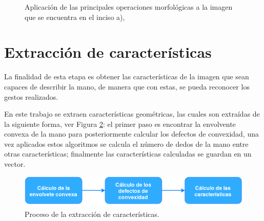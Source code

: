 \begin{figure}[h!]
\caption{Aplicación de las principales operaciones morfológicas a la imagen que se encuentra en el inciso a), \protect\citep{Smith1999} } \label{fig:OM}
\end{figure} 




\section{Extracción de características}\label{sec:Convexhull} 

La finalidad de esta etapa es obtener las características de la imagen que sean capaces de describir la mano, de manera que con estas, se pueda reconocer los gestos realizados.
   
En este trabajo se extraen características geométricas, las cuales son extraídas de la siguiente forma, ver Figura \ref{fig:DiagramaExtraccionCaracteristicas}: el primer paso es encontrar la envolvente convexa de la mano para posteriormente calcular los defectos de convexidad, una vez aplicados estos algoritmos se calcula el número de dedos de la mano entre otras características; finalmente las características calculadas  se guardan en un vector.  

\begin{figure}[h!]
\begin{center}
\includegraphics[scale=.7]{./Figures/DExtraccion.png}
\end{center}
\caption{Proceso de la extracción de características.}
\label{fig:DiagramaExtraccionCaracteristicas}
\end{figure} 

